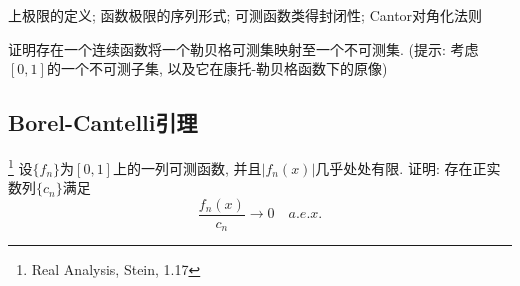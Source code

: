 \begin{knowledge}
    上极限的定义; 函数极限的序列形式; 可测函数类得封闭性; Cantor对角化法则
\end{knowledge}

\begin{exercise} %
    证明存在一个连续函数将一个勒贝格可测集映射至一个不可测集. (提示: 考虑$[0,1]$的一个不可测子集, 以及它在康托-勒贝格函数下的原像)
\end{exercise}

\subsection{Borel-Cantelli引理}

\begin{exercise}\footnote{Real Analysis, Stein, 1.17}
    设$\{f_n\}$为$[0,1]$上的一列可测函数, 并且$|f_n(x)|$几乎处处有限. 证明: 存在正实数列$\{c_n\}$满足
    $$ \frac{f_n(x)}{c_n} \to 0 \quad a.e. x. $$
\end{exercise}